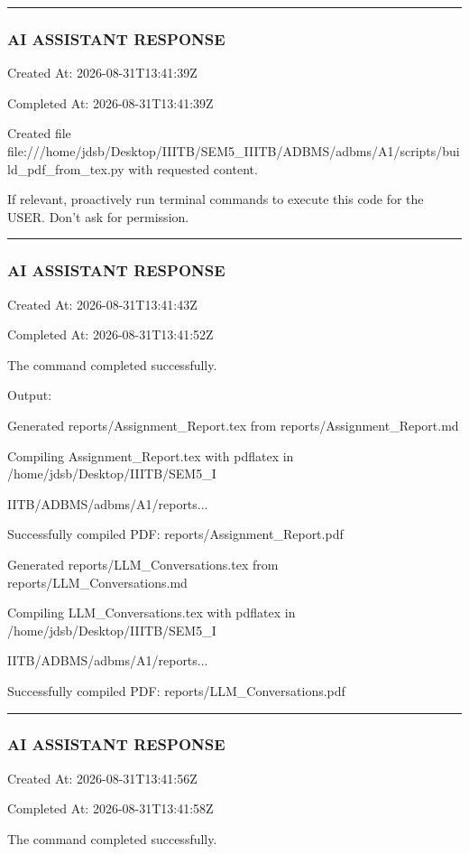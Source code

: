 \documentclass[11pt,a4paper]{article}
\begin{document}
{{{\hrule

\subsubsection{AI ASSISTANT RESPONSE}

Created At: 2026-08-31T13:41:39Z

Completed At: 2026-08-31T13:41:39Z

Created file file:///home/jdsb/Desktop/IIITB/SEM5\_IIITB/ADBMS/adbms/A1/scripts/build\_pdf\_from\_tex.py with requested content.

If relevant, proactively run terminal commands to execute this code for the USER. Don't ask for permission.


\hrule

\subsubsection{AI ASSISTANT RESPONSE}

Created At: 2026-08-31T13:41:43Z

Completed At: 2026-08-31T13:41:52Z


The command completed successfully.

Output:

Generated reports/Assignment\_Report.tex from reports/Assignment\_Report.md

Compiling Assignment\_Report.tex with pdflatex in /home/jdsb/Desktop/IIITB/SEM5\_I

IITB/ADBMS/adbms/A1/reports...

Successfully compiled PDF: reports/Assignment\_Report.pdf

Generated reports/LLM\_Conversations.tex from reports/LLM\_Conversations.md

Compiling LLM\_Conversations.tex with pdflatex in /home/jdsb/Desktop/IIITB/SEM5\_I

IITB/ADBMS/adbms/A1/reports...

Successfully compiled PDF: reports/LLM\_Conversations.pdf


\hrule

\subsubsection{AI ASSISTANT RESPONSE}

Created At: 2026-08-31T13:41:56Z

Completed At: 2026-08-31T13:41:58Z


The command completed successfully.

}}}
\end{document}
